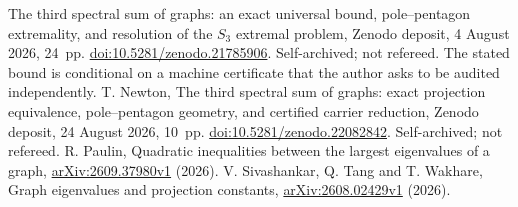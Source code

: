The third spectral sum of graphs: an exact universal bound, pole--pentagon
extremality, and resolution of the $S_3$ extremal problem,
Zenodo deposit, 4 August 2026, 24~pp.
\href{https://doi.org/10.5281/zenodo.21785906}{doi:10.5281/zenodo.21785906}.
Self-archived; not refereed. The stated bound is conditional on a machine
certificate that the author asks to be audited independently.
T. Newton,
The third spectral sum of graphs: exact projection equivalence,
pole--pentagon geometry, and certified carrier reduction,
Zenodo deposit, 24 August 2026, 10~pp.
\href{https://doi.org/10.5281/zenodo.22082842}{doi:10.5281/zenodo.22082842}.
Self-archived; not refereed.
R. Paulin,
Quadratic inequalities between the largest eigenvalues of a graph,
\href{https://arxiv.org/abs/2609.37980v1}{arXiv:2609.37980v1} (2026).
V. Sivashankar, Q. Tang and T. Wakhare,
Graph eigenvalues and projection constants,
\href{https://arxiv.org/abs/2608.02429v1}{arXiv:2608.02429v1} (2026).
